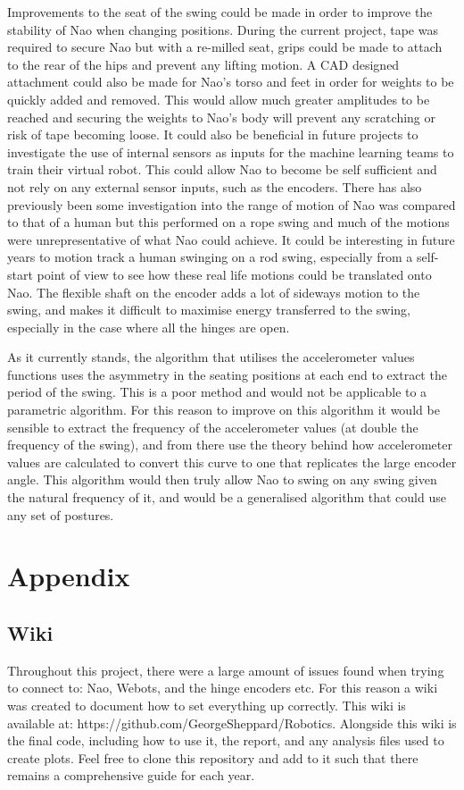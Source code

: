 \documentclass[11pt]{article}
\newcommand*\ruleline[1]{\par\noindent\raisebox{.8ex}{\makebox[\linewidth]{\hrulefill\hspace{1ex}\raisebox{-.8ex}{#1}\hspace{1ex}\hrulefill}}}
\begin{document}
\ruleline{David Thomas}
Improvements to the seat of the swing could be made in order to improve the stability of Nao when changing positions. During the current project, tape was required to secure Nao but with a re-milled seat, grips could be made to attach to the rear of the hips and prevent any lifting motion. A CAD designed attachment could also be made for Nao's torso and feet in order for weights to be quickly added and removed. This would allow much greater amplitudes to be reached and securing the weights to Nao's body will prevent any scratching or risk of tape becoming loose. It could also be beneficial in future projects to investigate the use of internal sensors as inputs for the machine learning teams to train their virtual robot. This could allow Nao to become be self sufficient and not rely on any external sensor inputs, such as the encoders. There has also previously been some investigation into the range of motion of Nao was compared to that of a human but this performed on a rope swing and much of the motions were unrepresentative of what Nao could achieve. It could be interesting in future years to motion track a human swinging on a rod swing, especially from a self-start point of view to see how these real life motions could be translated onto Nao. The flexible shaft on the encoder adds a lot of sideways motion to the swing, and makes it difficult to maximise energy transferred to the swing, especially in the case where all the hinges are open.\\

\ruleline{George Sheppard}
As it currently stands, the algorithm that utilises the accelerometer values functions uses the asymmetry in the seating positions at each end to extract the period of the swing. This is a poor method and would not be applicable to a parametric algorithm. For this reason to improve on this algorithm it would be sensible to extract the frequency of the accelerometer values (at double the frequency of the swing), and from there use the theory behind how accelerometer values are calculated to convert this curve to one that replicates the large encoder angle. This algorithm would then truly allow Nao to swing on any swing given the natural frequency of it, and would be a generalised algorithm that could use any set of postures.

\appendix
\section{Appendix}
\subsection{Wiki} \label{sec:wiki}
\ruleline{George Sheppard}
Throughout this project, there were a large amount of issues found when trying to connect to: Nao, Webots, and the hinge encoders etc. For this reason a wiki was created to document how to set everything up correctly. This wiki is available at: https://github.com/GeorgeSheppard/Robotics. Alongside this wiki is the final code, including how to use it, the report, and any analysis files used to create plots. Feel free to clone this repository and add to it such that there remains a comprehensive guide for each year.
\end{document}
